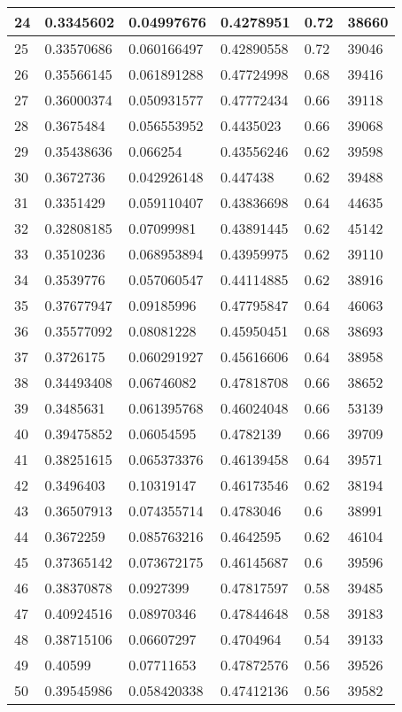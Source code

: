 \begin{longtable}{|l|l|l|l|l|l|}
24 & 0.3345602 & 0.04997676 & 0.4278951 & 0.72 & 38660 \\ \hline 
25 & 0.33570686 & 0.060166497 & 0.42890558 & 0.72 & 39046 \\ \hline 
26 & 0.35566145 & 0.061891288 & 0.47724998 & 0.68 & 39416 \\ \hline 
27 & 0.36000374 & 0.050931577 & 0.47772434 & 0.66 & 39118 \\ \hline 
28 & 0.3675484 & 0.056553952 & 0.4435023 & 0.66 & 39068 \\ \hline 
29 & 0.35438636 & 0.066254 & 0.43556246 & 0.62 & 39598 \\ \hline 
30 & 0.3672736 & 0.042926148 & 0.447438 & 0.62 & 39488 \\ \hline 
31 & 0.3351429 & 0.059110407 & 0.43836698 & 0.64 & 44635 \\ \hline 
32 & 0.32808185 & 0.07099981 & 0.43891445 & 0.62 & 45142 \\ \hline 
33 & 0.3510236 & 0.068953894 & 0.43959975 & 0.62 & 39110 \\ \hline 
34 & 0.3539776 & 0.057060547 & 0.44114885 & 0.62 & 38916 \\ \hline 
35 & 0.37677947 & 0.09185996 & 0.47795847 & 0.64 & 46063 \\ \hline 
36 & 0.35577092 & 0.08081228 & 0.45950451 & 0.68 & 38693 \\ \hline 
37 & 0.3726175 & 0.060291927 & 0.45616606 & 0.64 & 38958 \\ \hline 
38 & 0.34493408 & 0.06746082 & 0.47818708 & 0.66 & 38652 \\ \hline 
39 & 0.3485631 & 0.061395768 & 0.46024048 & 0.66 & 53139 \\ \hline 
40 & 0.39475852 & 0.06054595 & 0.4782139 & 0.66 & 39709 \\ \hline 
41 & 0.38251615 & 0.065373376 & 0.46139458 & 0.64 & 39571 \\ \hline 
42 & 0.3496403 & 0.10319147 & 0.46173546 & 0.62 & 38194 \\ \hline 
43 & 0.36507913 & 0.074355714 & 0.4783046 & 0.6 & 38991 \\ \hline 
44 & 0.3672259 & 0.085763216 & 0.4642595 & 0.62 & 46104 \\ \hline 
45 & 0.37365142 & 0.073672175 & 0.46145687 & 0.6 & 39596 \\ \hline 
46 & 0.38370878 & 0.0927399 & 0.47817597 & 0.58 & 39485 \\ \hline 
47 & 0.40924516 & 0.08970346 & 0.47844648 & 0.58 & 39183 \\ \hline 
48 & 0.38715106 & 0.06607297 & 0.4704964 & 0.54 & 39133 \\ \hline 
49 & 0.40599 & 0.07711653 & 0.47872576 & 0.56 & 39526 \\ \hline 
50 & 0.39545986 & 0.058420338 & 0.47412136 & 0.56 & 39582 \\ \hline 
\end{longtable}